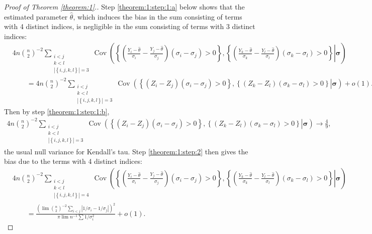\documentclass[12pt]{article}
\newcommand{\z}{Z}
\newcommand{\y}{Y}
\DeclareMathOperator{\Cov}{Cov}
\begin{document}
\begin{proof}[Proof of Theorem \ref{theorem:1}.]
  Step \ref{theorem:1:step:1:a} below shows that the estimated
  parameter $\hat\theta$, which induces the bias in the sum consisting of 
  terms with 4 distinct indices, is negligible in the sum consisting of terms with 3 distinct indices:
  \begin{align}
    &4n{n\choose 2}^{-2}\sum_{\substack{i<j\\k<l\\|\left\{i,j,k,l\right\}|=3}}\Cov\left(\left.
    \left\{\left(\frac{\y_i-\hat\theta}{\sigma_i}-\frac{\y_j-\hat\theta}{\sigma_j}\right)(\sigma_i-\sigma_j)>0\right\},
      \left\{\left(\frac{\y_k-\hat\theta}{\sigma_k}-\frac{\y_l-\hat\theta}{\sigma_l}\right)(\sigma_k-\sigma_l)>0\right\}
    \right|\pmb{\sigma}\right)\\
    &\qquad=4n{n\choose 2}^{-2}\sum_{\substack{i<j\\k<l\\|\left\{i,j,k,l\right\}|=3}}\Cov\left(\left.
    \left\{\left(\z_i-\z_j\right)(\sigma_i-\sigma_j)>0\right\},
    \left\{\left(\z_k-\z_l\right)(\sigma_k-\sigma_l)>0\right\}
    \right|\pmb{\sigma}\right) + o(1).
  \end{align}
  Then by step \ref{theorem:1:step:1:b},
  \begin{align}
    4n{n\choose 2}^{-2}\sum_{\substack{i<j\\k<l\\|\left\{i,j,k,l\right\}|=3}}\Cov\left(\left.
    \left\{\left(\z_i-\z_j\right)(\sigma_i-\sigma_j)>0\right\},
    \left\{\left(\z_k-\z_l\right)(\sigma_k-\sigma_l)>0\right\}
    \right|\pmb{\sigma}\right) \to \frac{4}{9},
  \end{align}
  the usual null variance for Kendall's tau.
  Step \ref{theorem:1:step:2} then gives the bias due to the terms with 4 distinct indices:
  \begin{align}
    &4n{n\choose 2}^{-2}\sum_{\substack{i<j\\k<l\\|\left\{i,j,k,l\right\}|=4}}\Cov\left(\left.
    \left\{\left(\frac{\y_i-\hat\theta}{\sigma_i}-\frac{\y_j-\hat\theta}{\sigma_j}\right)(\sigma_i-\sigma_j)>0\right\},
      \left\{\left(\frac{\y_k-\hat\theta}{\sigma_k}-\frac{\y_l-\hat\theta}{\sigma_l}\right)(\sigma_k-\sigma_l)>0\right\}
    \right|\pmb{\sigma}\right) \label{theorem:1:l:1}\\
    &\qquad=\frac{\left(\lim {n\choose 2}^{-2}\sum_{i<j}|1/\sigma_i-1/\sigma_j|\right)^2}
        {\pi \lim n^{-1}\sum 1/\sigma_i^2}+ o(1).
  \end{align}


\end{proof}
\end{document}
